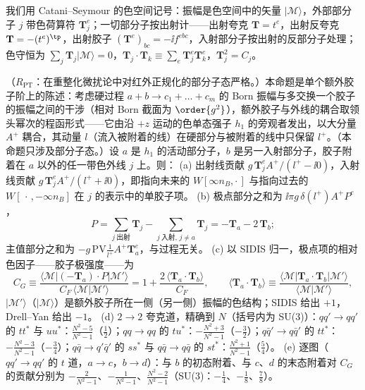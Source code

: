 我们用 Catani--Seymour 的色空间记号\cite{CataniSeymour1997}：振幅是色空间中的矢量 $|\mathcal M\rangle$，外部部分子 $j$ 带色荷算符 $\mathbf T_j^e$；一切部分子按出射计——出射夸克 $\mathbf T=t^e$，出射反夸克 $\mathbf T=-(t^e)^{\tp}$，出射胶子 $(\mathbf T^e)_{bc}=-\ii f^{ebc}$，入射部分子按出射的反部分子处理；色守恒为 $\sum_j\mathbf T_j|\mathcal M\rangle=0$，$\mathbf T_j\cdot\mathbf T_k\equiv\sum_e\mathbf T_j^e\mathbf T_k^e$，$\mathbf T_j^2=C_j$。

\begin{proposition}\label{prop:break-colour}
（$R_{\mathrm{PT}}$：在重整化微扰论中对红外正规化的部分子态严格。）本命题是单个额外胶子阶上的陈述：考虑硬过程 $a+b\to c_1+\dots+c_m$ 的 Born 振幅与多交换一个胶子的振幅之间的干涉（相对 Born 截面为 $\order{g^2}$），额外胶子与外线的耦合取领头幂次的程函形式——它由沿 $+z$ 运动的色单态强子 $h_1$ 的旁观者发出，以大分量 $A^+$ 耦合，其动量 $l$（流入被附着的线）在硬部分与被附着的线中只保留 $l^+$。（本命题只涉及部分子态。）设 $a$ 是 $h_1$ 的活动部分子，$b$ 是另一入射部分子，胶子附着在 $a$ 以外的任一带色外线 $j$ 上。则：
(a) 出射线贡献 $g\,\mathbf T_j^eA^+/(l^+-\ii0)$，入射线贡献 $g\,\mathbf T_j^eA^+/(l^++\ii0)$，即指向未来的 $W[\infty n_B,\cdot\,]$ 与指向过去的 $W[\,\cdot\,,-\infty n_B]$ 在 $j$ 的表示中的单胶子项。
(b) 极点部分之和为 $\ii\pi g\,\delta(l^+)A^+P^e$，
\begin{equation}\label{eq:break-P}
P=\sum_{j\ \text{出射}}\mathbf T_j-\sum_{j\ \text{入射},\,j\neq a}\mathbf T_j=-\mathbf T_a-2\,\mathbf T_b ;
\end{equation}
主值部分之和为 $-g\,\mathrm{PV}\frac{1}{l^+}A^+\mathbf T_a^e$，与过程无关。
(c) 以 SIDIS 归一，极点项的相对色因子——胶子极强度——为
\begin{equation}\label{eq:break-CG}
C_G\equiv\frac{\langle\mathcal M|(-\mathbf T_a)\cdot P|\mathcal M'\rangle}{C_F\,\langle\mathcal M|\mathcal M'\rangle}=1+\frac{2\,\langle\mathbf T_a\cdot\mathbf T_b\rangle}{C_F},\qquad
\langle\mathbf T_a\cdot\mathbf T_b\rangle\equiv\frac{\langle\mathcal M|\mathbf T_a\cdot\mathbf T_b|\mathcal M'\rangle}{\langle\mathcal M|\mathcal M'\rangle},
\end{equation}
$|\mathcal M'\rangle$（$|\mathcal M\rangle$）是额外胶子所在一侧（另一侧）振幅的色结构；SIDIS 给出 $+1$，Drell--Yan 给出 $-1$。
(d) $2\to2$ 夸克道，精确到 $N$（括号内为 SU(3)）：$qq'\to qq'$ 的 $tt^*$ 与 $uu^*$：$\frac{N^2-5}{N^2-1}$（$\frac12$）；$qq\to qq$ 的 $tu^*$：$-\frac{N^2+3}{N^2-1}$（$-\frac32$）；$q\bar q'\to q\bar q'$ 的 $tt^*$：$-\frac{N^2-3}{N^2-1}$（$-\frac34$）；$q\bar q\to q'\bar q'$ 的 $ss^*$ 与 $q\bar q\to q\bar q$ 的 $st^*$：$\frac{N^2+1}{N^2-1}$（$\frac54$）。
(e) 逐图（$qq'\to qq'$ 的 $t$ 道，$a\to c$，$b\to d$）：与 $b$ 的初态附着、与 $c$、$d$ 的末态附着对 $C_G$ 的贡献分别为 $-\frac{2}{N^2-1}$、$-\frac{1}{N^2-1}$、$\frac{N^2-2}{N^2-1}$（SU(3)：$-\frac14$、$-\frac18$、$\frac78$）。
\end{proposition}

